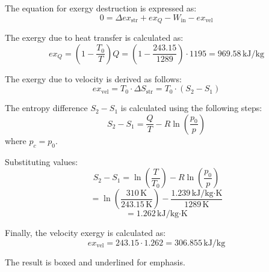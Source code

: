 The equation for exergy destruction is expressed as:  
\[
0 = \Delta ex_{\text{str}} + ex_Q - W_{\text{in}} - ex_{\text{vel}}
\]  

The exergy due to heat transfer is calculated as:  
\[
ex_Q = \left( 1 - \frac{T_0}{T} \right) Q = \left( 1 - \frac{243.15}{1289} \right) \cdot 1195 = 969.58 \, \text{kJ/kg}
\]  

The exergy due to velocity is derived as follows:  
\[
ex_{\text{vel}} = T_0 \cdot \Delta S_{\text{str}} = T_0 \cdot (S_2 - S_1)
\]  

The entropy difference \( S_2 - S_1 \) is calculated using the following steps:  
\[
S_2 - S_1 = \frac{Q}{T} - R \ln \left( \frac{p_0}{p} \right)
\]  
where \( p_c = p_0 \).  

Substituting values:  
\[
S_2 - S_1 = \ln \left( \frac{T}{T_0} \right) - R \ln \left( \frac{p_0}{p} \right)
\]  
\[
= \ln \left( \frac{310 \, \text{K}}{243.15 \, \text{K}} \right) - \frac{1.239 \, \text{kJ/kg·K}}{1289 \, \text{K}}
\]  
\[
= 1.262 \, \text{kJ/kg·K}
\]  

Finally, the velocity exergy is calculated as:  
\[
ex_{\text{vel}} = 243.15 \cdot 1.262 = 306.855 \, \text{kJ/kg}
\]  

The result is boxed and underlined for emphasis.